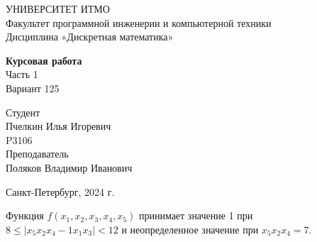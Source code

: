 \documentclass{article}
\begin{document}
\begin{center}
    УНИВЕРСИТЕТ ИТМО \\
    Факультет программной инженерии и компьютерной техники \\
    Дисциплина «Дискретная математика»
    
    \vspace{5cm}

    \large
    \textbf{Курсовая работа} \\
    Часть 1 \\
    Вариант 125
\end{center}

\vspace{2cm}

\hfill\begin{minipage}{0.35\linewidth}
Студент \\
Пчелкин Илья Игоревич \\
P3106 \\

Преподаватель \\
Поляков Владимир Иванович
\end{minipage}

\vfill

\begin{center}
    Санкт-Петербург, 2024 г.
\end{center}

\thispagestyle{empty}
\newpage

Функция $f(x_1,x_2,x_3,x_4,x_5)$ принимает значение 1 при $8 \le |x_5 x_2 x_4 - 1 x_1 x_3| < 12$ и неопределенное значение при $x_5 x_2 x_4 = 7$.  
\end{document}
